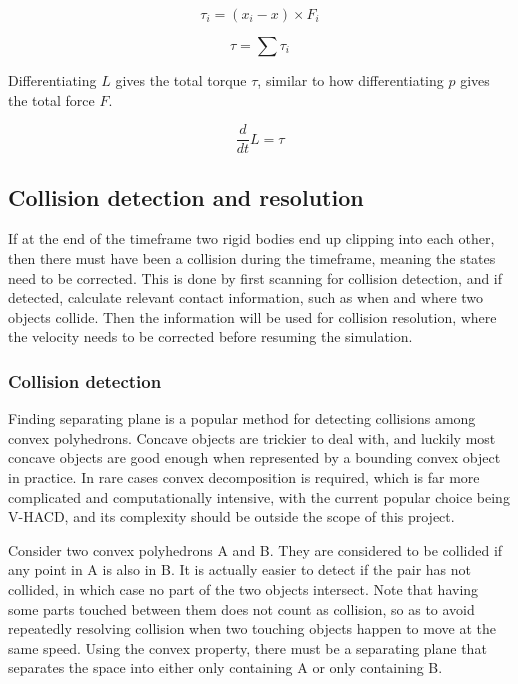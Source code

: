 \documentclass[12pt,a4paper,twoside,openright]{report}
\begin{document}
\begin{equation}
\tau_i = (x_i - x) \times F_i
\end{equation}

\begin{equation}
\tau = \sum \tau_i
\end{equation}

Differentiating $L$ gives the total torque $\tau$, similar to how differentiating $p$ gives the total force $F$.

\begin{equation}
\frac{d}{dt} L = \tau
\end{equation}

\subsection{Collision detection and resolution}

If at the end of the timeframe two rigid bodies end up clipping into each other, then there must have been a collision during the timeframe, meaning the states need to be corrected. This is done by first scanning for collision detection, and if detected, calculate relevant contact information, such as when and where two objects collide. Then the information will be used for collision resolution, where the velocity needs to be corrected before resuming the simulation.

\subsubsection{Collision detection}

Finding separating plane is a popular method for detecting collisions among convex polyhedrons. Concave objects are trickier to deal with, and luckily most concave objects are good enough when represented by a bounding convex object in practice. In rare cases convex decomposition is required, which is far more complicated and computationally intensive, with the current popular choice being V-HACD\cite{mamou2016volumetric}, and its complexity should be outside the scope of this project.

Consider two convex polyhedrons A and B. They are considered to be collided if any point in A is also in B. It is actually easier to detect if the pair has not collided, in which case no part of the two objects intersect. Note that having some parts touched between them does not count as collision, so as to avoid repeatedly resolving collision when two touching objects happen to move at the same speed. Using the convex property, there must be a separating plane that separates the space into either only containing A or only containing B.
\end{document}

